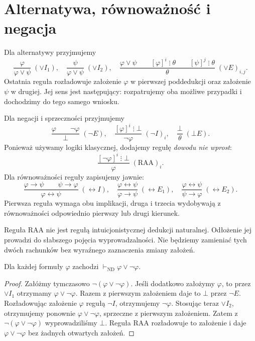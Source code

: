 \section{Alternatywa, równoważność i negacja}
\begin{definicja}\label{def:nd-rules-prop}
Dla alternatywy przyjmujemy
\[
\frac{\varphi}{\varphi\lor\psi}\;(\lor I_1),
\quad
\frac{\psi}{\varphi\lor\psi}\;(\lor I_2),
\quad
\frac{\varphi\lor\psi\qquad
[\varphi]^i\;\vdots\;\theta\qquad
[\psi]^j\;\vdots\;\theta}{\theta}\;(\lor E)_{i,j}.
\]
Ostatnia reguła rozładowuje założenie $\varphi$
w pierwszej poddedukcji oraz założenie $\psi$
w drugiej. Jej sens jest następujący: rozpatrujemy oba
możliwe przypadki i dochodzimy do tego samego wniosku.

Dla negacji i sprzeczności przyjmujemy
\[
\frac{\varphi\qquad\neg\varphi}{\bot}\;(\neg E),
\quad
\frac{[\varphi]^i\;\vdots\;\bot}{\neg\varphi}\;(\neg I)_i,
\quad
\frac{\bot}{\theta}\;(\bot E).
\]
Ponieważ używamy logiki klasycznej, dodajemy regułę
\emph{dowodu nie wprost}:
\[
\frac{[\neg\varphi]^i\;\vdots\;\bot}{\varphi}\;(\mathrm{RAA})_i.
\]
Dla równoważności reguły zapisujemy jawnie:
\[
\frac{\varphi\to\psi\qquad\psi\to\varphi}
     {\varphi\leftrightarrow\psi}\;(\leftrightarrow I),
\quad
\frac{\varphi\leftrightarrow\psi}{\varphi\to\psi}\;(\leftrightarrow E_1),
\quad
\frac{\varphi\leftrightarrow\psi}{\psi\to\varphi}\;(\leftrightarrow E_2).
\]
Pierwsza reguła wymaga obu implikacji, druga i trzecia wydobywają
z równoważności odpowiednio pierwszy lub drugi kierunek.
\end{definicja}
\begin{uwaga}
Reguła $\mathrm{RAA}$ nie jest regułą intuicjonistycznej
dedukcji naturalnej. Odłożenie jej prowadzi do słabszego
pojęcia wyprowadzalności. Nie będziemy zamieniać tych
dwóch rachunków bez wyraźnego zaznaczenia zmiany założeń.
\end{uwaga}

\begin{twierdzenie}
\label{thm:nd-lem}
Dla każdej formuły $\varphi$ zachodzi
$\vdash_{\mathrm{ND}}\varphi\lor\neg\varphi$.
\end{twierdzenie}
\begin{proof}
Załóżmy tymczasowo $\neg(\varphi\lor\neg\varphi)$.
Jeśli dodatkowo założymy $\varphi$, to przez $\lor I_1$
otrzymamy $\varphi\lor\neg\varphi$.
Razem z pierwszym założeniem daje to $\bot$ przez $\neg E$.
Rozładowując założenie $\varphi$ regułą $\neg I$,
otrzymujemy $\neg\varphi$.
Stosując teraz $\lor I_2$, otrzymujemy ponownie
$\varphi\lor\neg\varphi$, sprzeczne z pierwszym założeniem.
Zatem z $\neg(\varphi\lor\neg\varphi)$ wyprowadziliśmy $\bot$.
Reguła $\mathrm{RAA}$ rozładowuje to założenie
i daje $\varphi\lor\neg\varphi$ bez żadnych otwartych założeń.
\end{proof}

